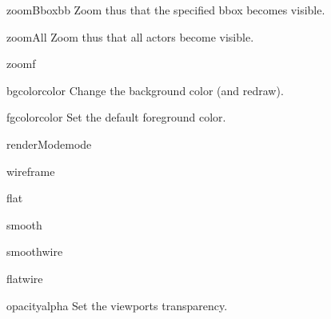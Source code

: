 \begin{funcdesc}{zoomBbox}{bb}
Zoom thus that the specified bbox becomes visible.

\end{funcdesc}


\begin{funcdesc}{zoomAll}{}
Zoom thus that all actors become visible.

\end{funcdesc}


\begin{funcdesc}{zoom}{f}


\end{funcdesc}


\begin{funcdesc}{bgcolor}{color}
Change the background color (and redraw).

\end{funcdesc}


\begin{funcdesc}{fgcolor}{color}
Set the default foreground color.

\end{funcdesc}


\begin{funcdesc}{renderMode}{mode}


\end{funcdesc}


\begin{funcdesc}{wireframe}{}


\end{funcdesc}


\begin{funcdesc}{flat}{}


\end{funcdesc}


\begin{funcdesc}{smooth}{}


\end{funcdesc}


\begin{funcdesc}{smoothwire}{}


\end{funcdesc}


\begin{funcdesc}{flatwire}{}


\end{funcdesc}


\begin{funcdesc}{opacity}{alpha}
Set the viewports transparency.

\end{funcdesc}


